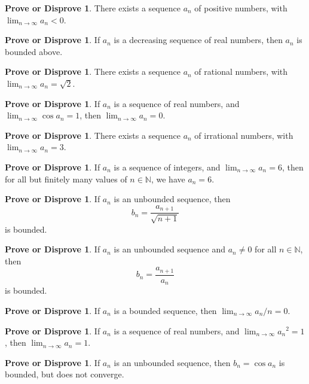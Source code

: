 \documentclass[12pt]{article}
\theoremstyle{definition}
\newtheorem{podsip}[theorem]{Prove or Disprove}
\newcommand{\N}{\mathbb{N}}
\newcommand{\limn}{\displaystyle\lim_{n \to \infty}}
\begin{document}
\begin{podsip} %
There exists a sequence $a_n$ of positive numbers, with $\limn a_n < 0$.
\end{podsip}

\begin{podsip} %
If $a_n$ is a decreasing sequence of real numbers, then $a_n$ is bounded above.
\end{podsip}

\begin{podsip} %
There exists a sequence $a_n$ of rational numbers, with $\limn a_n = \sqrt{2}$.
\end{podsip}

\begin{podsip} %
If $a_n$ is a sequence of real numbers, and $\limn \cos a_n = 1$, then $\limn a_n = 0$.
\end{podsip}

\begin{podsip} %
There exists a sequence $a_n$ of irrational numbers, with $\limn a_n = 3$.
\end{podsip}

\begin{podsip} %
If $a_n$ is a sequence of integers, and $\limn a_n = 6$, then for all but finitely many values of $n \in \N$, we have $a_n = 6$.
\end{podsip}

\begin{podsip} %
If $a_n$ is an unbounded sequence, then
$$
b_n = \frac{a_{n+1}}{\sqrt{n+1}}
$$
is bounded.
\end{podsip}

\begin{podsip} %
If $a_n$ is an unbounded sequence and $a_n \neq 0$ for all $n \in \N$, then
$$
b_n = \frac{a_{n+1}}{a_{n}}
$$
is bounded.
\end{podsip}

\begin{podsip} %
If $a_n$ is a bounded sequence, then $\limn a_n/n = 0$.
\end{podsip}

\begin{podsip} %
If $a_n$ is a sequence of real numbers, and $\limn {a_n}^2 = 1$, then $\limn a_n = 1$.
\end{podsip}

\begin{podsip} %
If $a_n$ is an unbounded sequence, then $b_n = \cos a_n$ is bounded, but does not converge.
\end{podsip}
\end{document}
